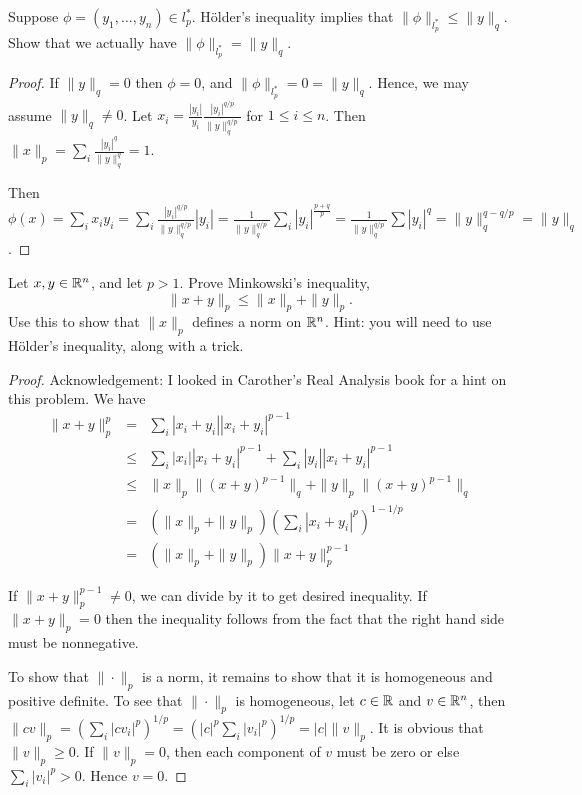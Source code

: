 \documentclass{article}
\begin{document}
 Suppose $\phi =(y_1, \ldots, y_n) \in l_p^*$. H\"{o}lder's inequality implies that $\|\phi\|_{l_p^*} \le \|y\|_q$. Show that we actually have $\|\phi\|_{l_p^*}  = \|y \|_q$.
\begin{proof}
If $\|y\|_q = 0$ then $\phi = 0$, and $\|\phi\|_{l_p^*} = 0 = \|y\|_q$.  Hence, we may assume $\|y\|_q \neq 0$.
Let $x_i = \frac {|y_i|} {y_i} \frac {|y_i|^{q/p}}{\|y\|_q^{q/p}}$ for $1 \le i \le n$.  Then $\|x\|_p = \sum_i \frac {|y_i|^q} {\|y\|_q^q} = 1$.

Then $\phi(x) = \sum_i x_i y_i = \sum_i \frac {|y_i|^{q/p}}{\|y\|_q^{q/p}} |y_i| = \frac 1 {\|y\|_q^{q/p}} \sum_i |y_i|^{\frac {p + q} p }  = \frac 1 {\|y\|_q^{q/p}} \sum |y_i|^q = \|y\|_q^{q - q/p} = \|y\|_q$.

\end{proof}

 Let $x,y \in \mathbb{R}^n$, and let $p > 1$. Prove Minkowski's inequality, 
$$\|x + y \|_p \le \|x\|_p + \|y\|_p. $$
Use this to show that $\|x\|_p$ defines a norm on $\mathbb{R}^n$. Hint: you will need to use H\"{o}lder's inequality, along with a trick.

\begin{proof}
Acknowledgement: I looked in Carother's Real Analysis book for a hint on this problem. We have 
\begin{align*}
\|x + y \|_p^p & = & \sum_i |x_i + y_i| |x_i + y_i|^{p-1}
\\ & \le & \sum_i |x_i| |x_i + y_i|^{p-1} + \sum_i |y_i| |x_i + y_i|^{p-1}
\\ & \le &  \|x\|_p \|(x + y)^{p-1}\|_q +  \|y\|_p \|(x + y)^{p-1}\|_q
\\ & = & ( \|x\|_p + \|y\|_p) \left( \sum_i |x_i + y_i|^p \right)^{1 - 1/p}
\\ & = &  ( \|x\|_p + \|y\|_p) \|x + y \|_p^{p - 1}
\end{align*}

If $\|x + y\|_p^{p-1} \neq 0$, we can divide by it to get desired inequality. If $\|x + y \|_p = 0$ then the inequality follows from the fact that the right hand side must be nonnegative.

To show that $\| \cdot \|_p$ is a norm, it remains to show that it is homogeneous and positive definite. To see that $\| \cdot \|_p$ is homogeneous, let $c \in \mathbb{R}$ and $v \in \mathbb{R}^n$, then $\|c v\|_p = \left( \sum_i |c v_i|^p \right)^{1/p} = \left(|c|^p \sum_i | v_i|^p \right)^{1/p} = |c| \|v\|_p$. It is obvious that $\|v\|_p \ge 0$.  If $\|v\|_p = 0$, then each component of $v$ must be zero or else $\sum_i |v_i|^p > 0$. Hence $v = 0$.

\end{proof}
\end{document}

